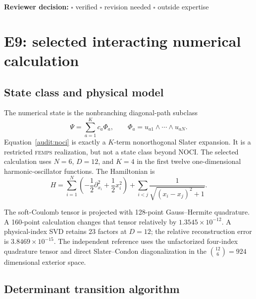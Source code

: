 \documentclass[11pt]{article}
\theoremstyle{definition}
\newcommand{\FEMPS}{\textnormal{\textsc{femps}}}
\newcommand{\reviewline}{\par\smallskip\noindent
  \textbf{Reviewer decision:} $\square$ verified \quad $\square$ revision
  needed \quad $\square$ outside expertise\par\medskip}
\begin{document}
\reviewline

\section{E9: selected interacting numerical calculation}

\subsection{State class and physical model}

The numerical state is the nonbranching diagonal-path subclass
\begin{equation}
\Psi=\sum_{a=1}^{K}c_a\Phi_a,
\qquad
\Phi_a=u_{a1}\wedge\cdots\wedge u_{aN}.
\label{audit:noci}
\end{equation}
Equation~\eqref{audit:noci} is exactly a $K$-term nonorthogonal Slater
expansion.  It is a restricted \FEMPS{} realization, but not a state class
beyond NOCI.  The selected calculation uses $N=6$, $D=12$, and $K=4$ in the
first twelve one-dimensional harmonic-oscillator functions.  The Hamiltonian
is
\begin{equation}
H=\sum_{i=1}^{N}\left(-\frac12\partial_{x_i}^2+\frac12x_i^2\right)
+\sum_{i<j}\frac{1}{\sqrt{(x_i-x_j)^2+1}}.
\label{audit:soft}
\end{equation}

The soft-Coulomb tensor is projected with 128-point Gauss--Hermite quadrature.
A 160-point calculation changes that tensor relatively by
$1.3545\times10^{-12}$.  A physical-index SVD retains 23 factors at $D=12$;
the relative reconstruction error is $3.8469\times10^{-15}$.  The independent
reference uses the unfactorized four-index quadrature tensor and direct
Slater--Condon diagonalization in the
$\binom{12}{6}=924$ dimensional exterior space.

\subsection{Determinant transition algorithm}
\end{document}
